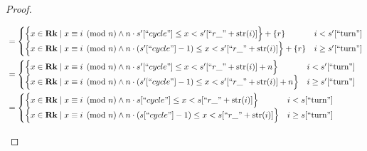 \documentclass{amsart}
\DeclareMathOperator{\Rk}{\mathbf{Rk}}
\theoremstyle{definition}
\begin{document}
\begin{proof}
\begin{enumerate}
\begin{enumerate}
\begin{align*}
                        &=
                            \begin{cases}
                                \Big\{x \in \Rk \mid x \equiv i \pmod n \land n \cdot s^\prime[``cycle"] \leq x < s^\prime[``r\_" + \mathrm{str}(i)] \Big\} + \{r\}
                                & i < s^\prime[``\text{turn}"]\\
                                \Big\{x \in \Rk \mid x \equiv i \pmod n \land n \cdot (s^\prime[``cycle"] - 1) \leq x < s^\prime[``r\_" + \mathrm{str}(i)]\Big\} + \{r\}
                                & i \geq s^\prime[``\text{turn}"]
                            \end{cases}\\
                        &=
                            \begin{cases}
                                \Big\{x \in \Rk \mid x \equiv i \pmod n \land n \cdot s^\prime[``cycle"] \leq x < s^\prime[``r\_" + \mathrm{str}(i)] + n\Big\}
                                & i < s^\prime[``\text{turn}"]\\
                                \Big\{x \in \Rk \mid x \equiv i \pmod n \land n \cdot (s^\prime[``cycle"] - 1) \leq x < s^\prime[``r\_" + \mathrm{str}(i)] + n\Big\}
                                & i \geq s^\prime[``\text{turn}"]
                            \end{cases}\\
                        &=
                            \begin{cases}
                                \Big\{x \in \Rk \mid x \equiv i \pmod n \land n \cdot s[``cycle"] \leq x < s[``r\_" + \mathrm{str}(i)] \Big\}
                                & i < s[``\text{turn}"]\\
                                \Big\{x \in \Rk \mid x \equiv i \pmod n \land n \cdot (s[``cycle"] - 1) \leq x < s[``r\_" + \mathrm{str}(i)]\Big\}
                                & i \geq s[``\text{turn}"]
                            \end{cases}
                    \end{align*}


\end{enumerate}
\end{enumerate}
\end{proof}
\end{document}
